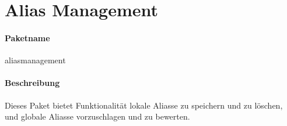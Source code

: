 \section{Alias Management}
\paragraph*{Paketname}
aliasmanagement
\paragraph*{Beschreibung}
Dieses Paket bietet Funktionalität lokale Aliasse zu speichern und zu löschen, 
und globale Aliasse vorzuschlagen und zu bewerten.

